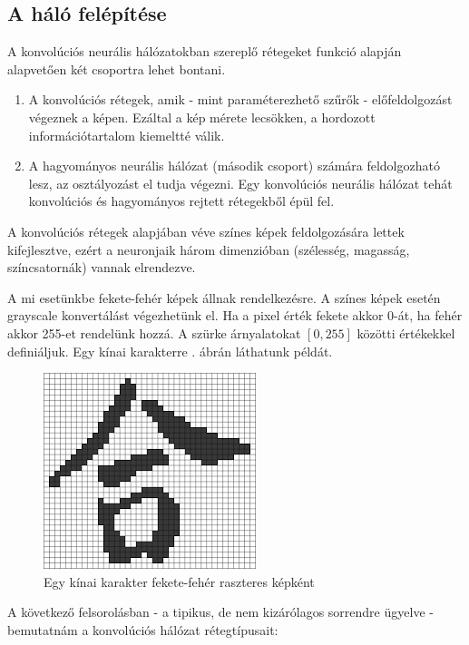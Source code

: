 \subsection{A háló felépítése}

A konvolúciós neurális hálózatokban szereplő rétegeket funkció alapján alapvetően két csoportra lehet bontani.

\begin{enumerate}
\item A konvolúciós rétegek, amik - mint paraméterezhető szűrők - előfeldolgozást végeznek a képen. Ezáltal a kép mérete lecsökken, a hordozott információtartalom kiemeltté válik.
\item A hagyományos neurális hálózat (második csoport) számára feldolgozható lesz, az osztályozást el tudja végezni. Egy konvolúciós neurális hálózat tehát konvolúciós és hagyományos rejtett rétegekből épül fel.
\end{enumerate}

A konvolúciós rétegek alapjában véve színes képek feldolgozására lettek kifejlesztve, ezért a neuronjaik három dimenzióban (szélesség, magasság, színcsatornák) vannak elrendezve.

A mi esetünkbe fekete-fehér képek állnak rendelkezésre. A színes képek esetén grayscale konvertálást végezhetünk el. Ha a pixel érték fekete akkor 0-át, ha fehér akkor 255-et rendelünk hozzá. A szürke árnyalatokat $[0, 255]$ közötti értékekkel definiáljuk. Egy kínai karakterre . ábrán láthatunk példát.

\begin{figure}[h]
\centering
\includegraphics[scale=0.65]{images/chinese_char_pixel}
\caption{Egy kínai karakter fekete-fehér raszteres képként}
\label{fig:chinese_char_pixel}
\end{figure}

A következő felsorolásban - a tipikus, de nem kizárólagos sorrendre ügyelve - bemutatnám a konvolúciós hálózat rétegtípusait:


